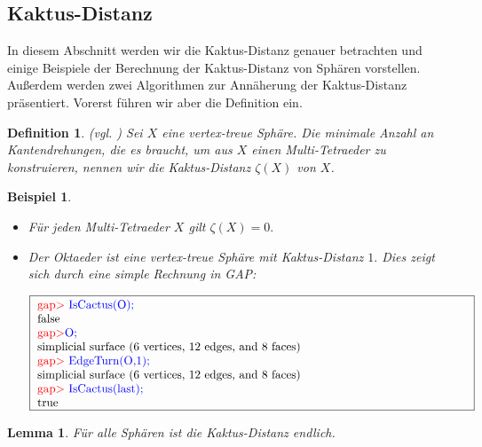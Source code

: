 \documentclass[12pt,titlepage,twoside,cleardoublepage]{article}
\theoremstyle{nummermitklammern}
\newtheorem{lemma}[temp]{Lemma}
\newtheorem{bsp}[temp]{Beispiel}
\newtheorem{definition}[temp]{Definition}
\newtheorem{definition}[zahl]{Definition}
\newtheorem{lemma}[zahl]{Lemma}
\newtheorem{bsp}[zahl]{Beispiel}
\numberwithin{equation}{section}
\begin{document}
\subsection{Kaktus-Distanz}
In diesem Abschnitt werden wir die Kaktus-Distanz genauer betrachten und einige Beispiele der Berechnung der Kaktus-Distanz von Sphären vorstellen.
Außerdem werden zwei Algorithmen zur Annäherung der Kaktus-Distanz präsentiert.
Vorerst führen wir aber die Definition ein.
\begin{definition}{\textsc{(}vgl. \textsc{\cite{simp})}}
Sei $X$ eine vertex-treue Sphäre. Die minimale Anzahl an Kantendrehungen, die es braucht, um aus $X$ einen Multi-Tetraeder zu  konstruieren, nennen wir die \emph{Kaktus-Distanz} $\zeta(X)$ von $X$.
\end{definition}
\begin{bsp}
\begin{itemize}
\item Für jeden Multi-Tetraeder $X$ gilt $\zeta(X)=0.$
\item Der Oktaeder ist eine vertex-treue Sphäre mit Kaktus-Distanz $1.$ Dies zeigt sich durch eine simple Rechnung in GAP:
\begin{center}
$\fbox{
\parbox{13cm}{
\textcolor{red}{gap$>$} \textcolor{blue}{IsCactus(O);}\\
false\\
\textcolor{red}{gap$>$}\textcolor{blue}{ O;}\\
simplicial surface (6 vertices, 12 edges, and 8 faces)\\
\textcolor{red}{gap$>$} \textcolor{blue}{EdgeTurn(O,1);}\\
simplicial surface (6 vertices, 12 edges, and 8 faces)\\
\textcolor{red}{gap$>$} \textcolor{blue}{IsCactus(last);}\\
true
}}$
\end{center}
\end{itemize}
\end{bsp}
\begin{lemma}
Für alle Sphären ist die Kaktus-Distanz endlich.
\end{lemma}
\end{document}
